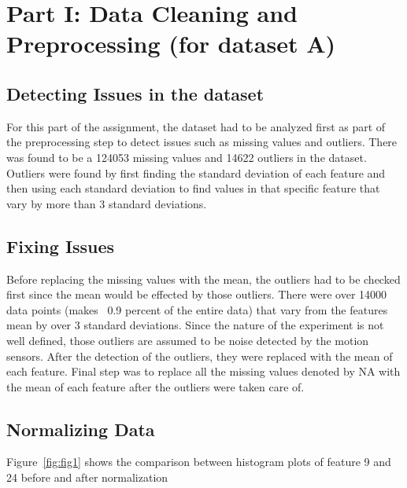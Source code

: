 \section{Part I: Data Cleaning and Preprocessing (for dataset A)}
\subsection{Detecting Issues in the dataset}
For this part of the assignment, the dataset had to be analyzed first as part of the preprocessing step to detect issues such as missing values and outliers. There was found to be a 124053 missing values and 14622 outliers in the dataset. Outliers were found by first finding the standard deviation of each feature and then using each standard deviation to find values in that specific feature that vary by more than 3 standard deviations. 

\subsection{Fixing Issues}
Before replacing the missing values with the mean, the outliers had to be checked first since the mean would be effected by those outliers. There were over 14000 data points (makes ~0.9 percent of the entire data) that vary from the features mean by over 3 standard deviations. Since the nature of the experiment is not well defined, those outliers are assumed to be noise detected by the motion sensors. After the detection of the outliers, they were replaced with the mean of each feature. Final step was to replace all the missing values denoted by NA with the mean of each feature after the outliers were taken care of. 

\subsection{Normalizing Data}



Figure~\ref{fig:fig1} shows the comparison between histogram plots of feature 9 and 24 before and after normalization

%
%

